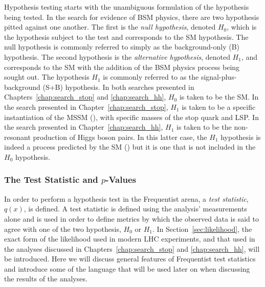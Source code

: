 Hypothesis testing starts with the unambiguous formulation of the hypothesis being
tested.
In the search for evidence of BSM physics, there are two hypothesis pitted
against one another.
The first is the \textit{null hypothesis}, denoted $H_0$, which is the hypothesis
subject to the test and corresponds to the SM hypothesis. The null hypothesis is commonly
referred to simply as the background-only (B) hypothesis.
The second hypothesis is the \textit{alternative hypothesis}, denoted $H_1$, and corresponds
to the SM with the addition of the BSM physics process being sought out.
The hypothesis $H_1$ is commonly referred to as the signal-plus-background (S+B) hypothesis.
In both searches presented in Chapters~\ref{chap:search_stop} and \ref{chap:search_hh},
$H_0$ is taken to be the SM.
In the search presented in Chapter~\ref{chap:search_stop}, $H_1$ is taken to be a specific
instantiation of the MSSM ({\color{red}{Section XXX}}), with specific masses of the
stop quark and LSP.
In the search presented in Chapter~\ref{chap:search_hh}, $H_1$ is taken to be the
non-resonant production of Higgs boson pairs.
In this latter case, the $H_1$ hypothesis is indeed a process predicted by the SM ({\color{red}{SECTION XXX about HH pheno and EWSB}}) but
it is one that is not included in the $H_0$ hypothesis.

%
%
\subsubsection{The Test Statistic and $p$-Values}

In order to perform a hypothesis test in the Frequentist arena, a \textit{test statistic}, $q(x)$,
is defined.
A test statistic is defined using the analysis' measurements alone and is
used in order to define metrics by which the observed data is said to agree with
one of the two hypothesis, $H_0$ or $H_1$.
In Section~\ref{sec:likelihood}, the exact form of the likelihood used in modern LHC experiments,
and that used in the analyses discussed in Chapters~\ref{chap:search_stop} and \ref{chap:search_hh},
will be introduced.
Here we will discuss general features of Frequentist test statistics and introduce
some of the language that will be used later on when discussing the results of the
analyses.

